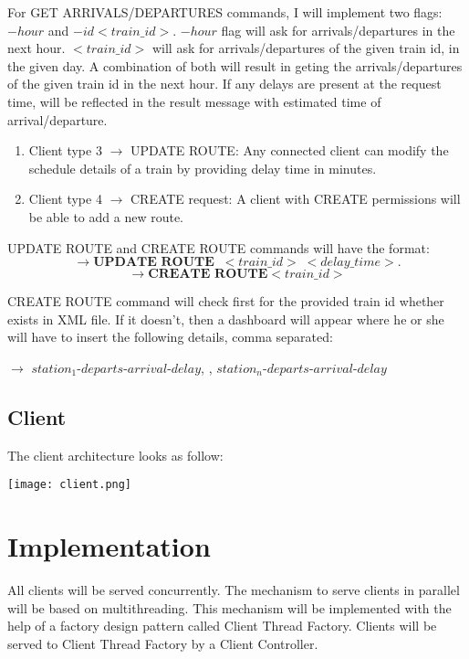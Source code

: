 \documentclass[runningheads]{llncs}
\begin{document}
 For GET ARRIVALS/DEPARTURES commands, I will implement two flags: $-hour$ and $-id <train\_id>$. $-hour$ flag will ask for arrivals/departures in the next hour. $<train\_id>$ will ask for arrivals/departures of the given train id, in the given day. A combination of both will result in geting the arrivals/departures of the given train id in the next hour. If any delays are present at the request time, will be reflected in the result message with estimated time of arrival/departure.


\begin{enumerate}
    \item Client type 3 $\rightarrow$ UPDATE ROUTE: Any connected client can modify the schedule details of a train by providing delay time in minutes.
    \item Client type 4 $\rightarrow$ CREATE request: A client with CREATE permissions will be able to add a new route.
\end{enumerate}

UPDATE ROUTE and CREATE ROUTE commands will have the format:  $$ \rightarrow \textbf{UPDATE ROUTE} \;\; <train\_id> \; <delay\_time>.
$$
$$ \rightarrow \textbf{CREATE ROUTE} <train\_id>$$

CREATE ROUTE command will check first for the provided train id whether exists in XML file. If it doesn't, then a dashboard will appear where he or she will have to insert the following details, comma separated:

    $\rightarrow$ $station_1$-$departs$-$arrival$-$delay$, \cdots, $station_n$-$departs$-$arrival$-$delay$

\subsection{Client}
The client architecture looks as follow:

\vspace{5mm}
\texttt{[image: client.png]}
\vspace{5mm}

\section{Implementation}

All clients will be served concurrently. The mechanism to serve clients in parallel will be based on multithreading.
This mechanism will be implemented with the help of a factory design pattern called Client Thread Factory. Clients will be served to Client Thread Factory by a Client Controller.
\end{document}
